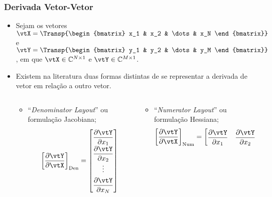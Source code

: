 \begin{frame}
	\frametitle{\normalsize Derivada Vetor-Vetor}
	\begin{itemize}
		\item Sejam os vetores $\vtX = \Transp{\begin{bmatrix} x_1 & x_2 & \dots & x_N \end{bmatrix}}$ e $\vtY = \Transp{\begin{bmatrix} y_1 & y_2 & \dots & y_M \end{bmatrix}}$, em que $\vtX \in \mathbb{C}^{N \times 1}$ e $\vtY \in \mathbb{C}^{M \times 1}$.
		\item Existem na literatura duas formas distintas de se representar a derivada de vetor em relação a outro vetor.
		\vspace*{-3ex}
		\begin{columns}
			\begin{column}[t]{0.4\paperwidth}
				\begin{itemize}
					\item ``\textit{Denominator Layout}'' ou formulação Jacobiana;
					\[\renewcommand{\arraystretch}{1.8}
						\left[ \dfrac{\partial \vtY}{\partial \vtX} \right]_{\textrm{Den}} = \begin{bmatrix} 
							\dfrac{\partial \vtY}{\partial x_1} \\
							\dfrac{\partial \vtY}{\partial x_2} \\ 
							\vdots \\ 
							\dfrac{\partial \vtY}{\partial x_N} 
						\end{bmatrix}
					\]
				\end{itemize}
			\end{column}
			\begin{column}[t]{0.4\paperwidth}
				\begin{itemize}
					\item ``\textit{Numerator Layout}'' ou formulação Hessiana;
					\[\renewcommand{\arraystretch}{1.8}
						\left[ \dfrac{\partial \vtY}{\partial \vtX} \right]_{\textrm{Num}} = \begin{bmatrix} 
							\dfrac{\partial \vtY}{\partial x_1} &
							\dfrac{\partial \vtY}{\partial x_2} & 
							\dots &
							\dfrac{\partial \vtY}{\partial x_N} 
						\end{bmatrix}
					\]
				\end{itemize}
			\end{column}
		\end{columns}
	\end{itemize}
\end{frame}

